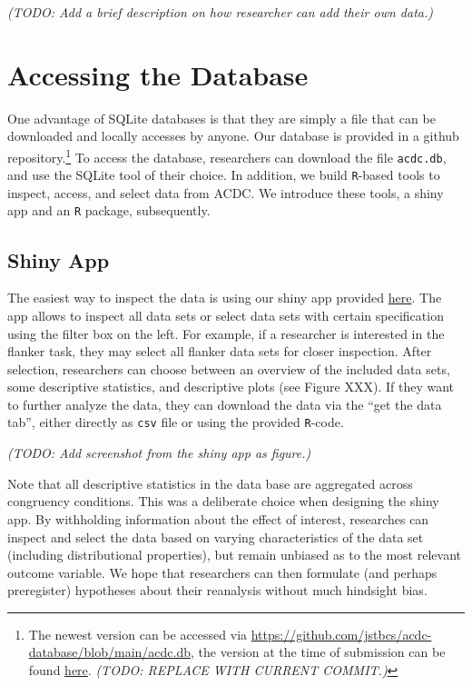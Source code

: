 \documentclass[
  man,floatsintext]{apa6}
\begin{document}
\emph{ (TODO: Add a brief description on how researcher can add their own data.)}

\hypertarget{accessing-the-database}{%
\section{Accessing the Database}\label{accessing-the-database}}

One advantage of SQLite databases is that they are simply a file that can be downloaded and locally accesses by anyone. Our database is provided in a github repository.\footnote{The newest version can be accessed via \url{https://github.com/jstbcs/acdc-database/blob/main/acdc.db}, the version at the time of submission can be found \href{https://github.com/jstbcs/acdc-database/blob/main/acdc.db}{here}. \emph{ (TODO: REPLACE WITH CURRENT COMMIT.)}} To access the database, researchers can download the file \texttt{acdc.db}, and use the SQLite tool of their choice. In addition, we build \texttt{R}-based tools to inspect, access, and select data from ACDC. We introduce these tools, a shiny app and an \texttt{R} package, subsequently.

\hypertarget{shiny-app}{%
\subsection{Shiny App}\label{shiny-app}}

The easiest way to inspect the data is using our shiny app provided \href{LINKTOSHINYAPP}{here}. The app allows to inspect all data sets or select data sets with certain specification using the filter box on the left. For example, if a researcher is interested in the flanker task, they may select all flanker data sets for closer inspection. After selection, researchers can choose between an overview of the included data sets, some descriptive statistics, and descriptive plots (see Figure XXX). If they want to further analyze the data, they can download the data via the ``get the data tab'', either directly as \texttt{csv} file or using the provided \texttt{R}-code.

\emph{ (TODO: Add screenshot from the shiny app as figure.)}

Note that all descriptive statistics in the data base are aggregated across congruency conditions. This was a deliberate choice when designing the shiny app. By withholding information about the effect of interest, researches can inspect and select the data based on varying characteristics of the data set (including distributional properties), but remain unbiased as to the most relevant outcome variable. We hope that researchers can then formulate (and perhaps preregister) hypotheses about their reanalysis without much hindsight bias.
\end{document}

